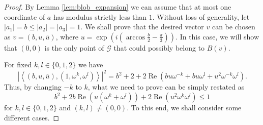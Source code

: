 \documentclass[12pt, a4paper]{article}
\theoremstyle{plain} %
\theoremstyle{definition} %
\theoremstyle{remark} %
\DeclareMathOperator{\re}{Re}
\begin{document}
\begin{proof}


By Lemma \ref{lem:blob_expansion} we can assume that at most one coordinate of $a$ has modulus strictly less than $1$. Without loss of generality, let $|a_1|=b \leq |a_2|=|a_3|=1$. We shall prove that the desired vector $v$ can be chosen as $v=(b, u, \overline{u})$, where $u=\exp{\left (i\left ( \arccos{\frac{b}{2}} - \frac{\pi}{3} \right ) \right )}$. In this case, we will show that $(0, 0)$ is the only point of $\mathcal{G}$ that could possibly belong to $B(v)$.

For fixed $k, l \in \{0, 1, 2\}$ we have
$$\left | \left \langle (b, u, \overline{u}), (1, \omega^k, \omega^l) \right \rangle \right |^2 = b^2 + 2 + 2 \re\left ( b u \omega^{-k} + b u \omega^{l} + u^2 \omega^{-k} \omega^{l} \right ).$$
Thus, by changing $-k$ to $k$, what we need to prove can be simply restated as
\begin{equation}
\label{desiredineq}
b^2 + 2b \re \left (u \left ( \omega^{k} + \omega^{l} \right ) \right ) + 2 \re \left (u^2\omega^k\omega^l \right ) \leq 1
\end{equation}
for $k, l \in \{0, 1, 2\}$ and $(k, l) \neq (0, 0)$. To this end, we shall consider some different cases.


\end{proof}
\end{document}
